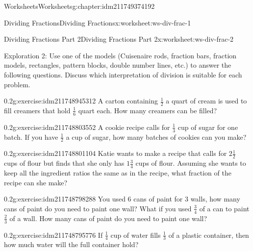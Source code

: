 \documentclass[twoside,11pt,]{book}
\begin{document}
\begin{chapterptx}{Worksheets}{}{Worksheets}{}{}{g:chapter:idm211749374192}
\begin{worksheet-section-numberless}{Dividing Fractions}{}{Dividing Fractions}{}{}{x:worksheet:ws-div-frac-1}
\end{worksheet-section-numberless}
\restoregeometry
%
%
\typeout{************************************************}
\typeout{************************************************}
%
\begin{worksheet-section-numberless}{Dividing Fractions Part 2}{}{Dividing Fractions Part 2}{}{}{x:worksheet:ws-div-frac-2}
\begin{introduction}{}%
Exploration 2: Use one of the models (Cuisenaire rods, fraction bars, fraction models, rectangles, pattern blocks, double number lines, etc.) to answer the following questions. Discuss which interpretation of division is suitable for each problem.%
\end{introduction}%
\begin{divisionexercise}{1}{}{0.2}{g:exercise:idm211748945312}%
A carton containing \(\frac{1}{2} \)  a quart of cream is used to fill creamers that hold \(\frac{1}{6} \)  quart each.  How many creamers can be filled?%
\end{divisionexercise}%
\begin{divisionexercise}{2}{}{0.2}{g:exercise:idm211748803552}%
A cookie recipe calls for \(\frac{1}{3} \) cup of sugar for one batch.  If you have \(\frac{1}{2} \) a cup of sugar, how many batches of cookies can you make?%
\end{divisionexercise}%
\begin{divisionexercise}{3}{}{0.2}{g:exercise:idm211748801104}%
Katie wants to make a recipe that calls for \(2 \frac{1}{2} \) cups of flour but finds that she only has \(1 \frac{3}{4} \) cups of flour. Assuming she wants to keep all the ingredient ratios the same as in the recipe, what fraction of the recipe can she make?%
\end{divisionexercise}%
\clearpage
\begin{divisionexercise}{4}{}{0.2}{g:exercise:idm211748798288}%
You used 6 cans of paint for 3 walls, how many cans of paint do you need to paint one wall?  What if you used \(\frac{3}{4} \) of a can to paint \(\frac{2}{3} \) of a wall. How many cans of paint do you need to paint one wall?%
\end{divisionexercise}%
\begin{divisionexercise}{5}{}{0.2}{g:exercise:idm211748795776}%
If \(\frac{1}{4} \)  cup of water fills \(\frac{1}{3} \)  of a plastic container, then how much water will the full container hold?%
\end{divisionexercise}%

\end{worksheet-section-numberless}
\end{chapterptx}
\end{document}
